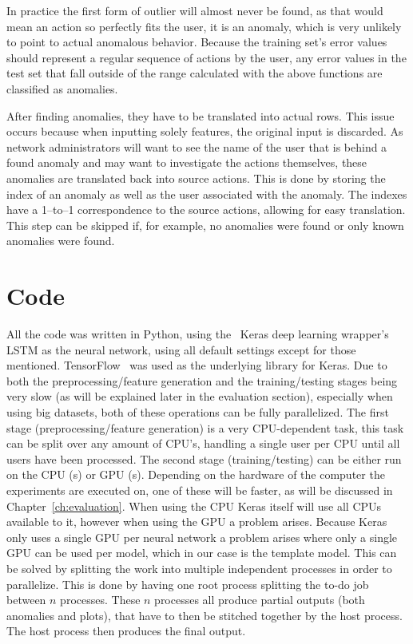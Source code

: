 In practice the first form of outlier will almost never be found, as that would mean an action so perfectly fits the user, it is an anomaly, which is very unlikely to point to actual anomalous behavior. Because the training set's error values should represent a regular sequence of actions by the user, any error values in the test set that fall outside of the range calculated with the above functions are classified as anomalies.

After finding anomalies, they have to be translated into actual rows. This issue occurs because when inputting solely features, the original input is discarded. As network administrators will want to see the name of the user that is behind a found anomaly and may want to investigate the actions themselves, these anomalies are translated back into source actions. This is done by storing the index of an anomaly as well as the user associated with the anomaly. The indexes have a 1--to--1 correspondence to the source actions, allowing for easy translation. This step can be skipped if, for example, no anomalies were found or only known anomalies were found.

\section{Code}
All the code was written in Python, using the~\cite{chollet2015keras} Keras deep learning wrapper's LSTM as the neural network, using all default settings except for those mentioned. TensorFlow~\cite{tensorflow2015-whitepaper} was used as the underlying library for Keras. Due to both the preprocessing/feature generation and the training/testing stages being very slow (as will be explained later in the evaluation section), especially when using big datasets, both of these operations can be fully parallelized. The first stage (preprocessing/feature generation) is a very CPU-dependent task, this task can be split over any amount of CPU's, handling a single user per CPU until all users have been processed. The second stage (training/testing) can be either run on the CPU (s) or GPU (s). Depending on the hardware of the computer the experiments are executed on, one of these will be faster, as will be discussed in Chapter~\ref{ch:evaluation}. When using the CPU Keras itself will use all CPUs available to it, however when using the GPU a problem arises. Because Keras only uses a single GPU per neural network a problem arises where only a single GPU can be used per model, which in our case is the template model. This can be solved by splitting the work into multiple independent processes in order to parallelize. This is done by having one root process splitting the to-do job between \(n\) processes. These \(n\) processes all produce partial outputs (both anomalies and plots), that have to then be stitched together by the host process. The host process then produces the final output.